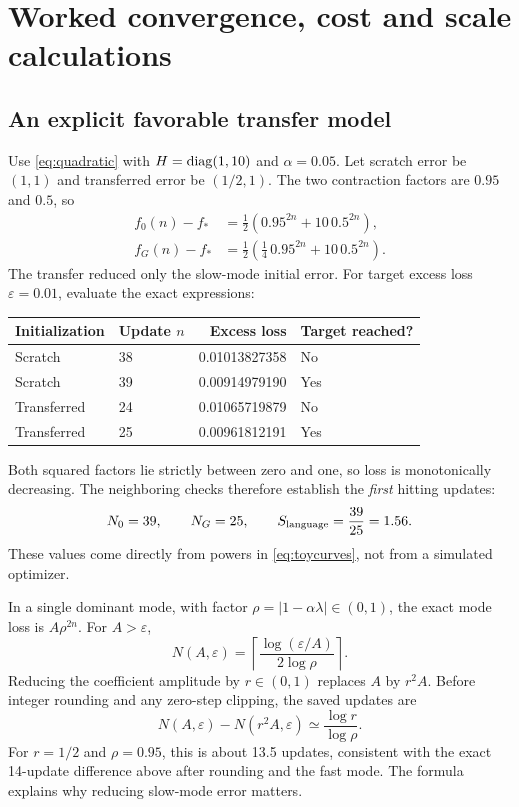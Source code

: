 \section{Worked convergence, cost and scale calculations}
\label{sec:numerical}

\subsection{An explicit favorable transfer model}

Use \eqref{eq:quadratic} with $H=\operatorname{diag}(1,10)$ and $\alpha=0.05$.
Let scratch error be $(1,1)$ and transferred error be $(1/2,1)$.
The two contraction factors are $0.95$ and $0.5$, so
\begin{align}
 f_0(n)-f_*&=\frac12\left(0.95^{2n}+10\,0.5^{2n}\right),\\
 f_G(n)-f_*&=\frac12\left(\frac14\,0.95^{2n}
                                  +10\,0.5^{2n}\right).
 \label{eq:toycurves}
\end{align}
The transfer reduced only the slow-mode initial error.
For target excess loss $\varepsilon=0.01$, evaluate the exact expressions:
\begin{center}
\begin{tabular}{@{}llrl@{}}
\toprule
Initialization & Update $n$ & Excess loss & Target reached?\\
\midrule
Scratch & 38 & 0.01013827358 & No\\
Scratch & 39 & 0.00914979190 & Yes\\
Transferred & 24 & 0.01065719879 & No\\
Transferred & 25 & 0.00961812191 & Yes\\
\bottomrule
\end{tabular}
\end{center}
Both squared factors lie strictly between zero and one, so loss is
monotonically decreasing. The neighboring checks therefore establish
the \emph{first} hitting updates:
\begin{equation}
 N_0=39,\qquad N_G=25,\qquad
 S_{\rm language}=\frac{39}{25}=1.56.
\end{equation}
These values come directly from powers in \eqref{eq:toycurves}, not
from a simulated optimizer.

In a single dominant mode, with factor $\rho=|1-\alpha\lambda|\in(0,1)$,
the exact mode loss is $A\rho^{2n}$. For $A>\varepsilon$,
\begin{equation}
 N(A,\varepsilon)=
 \left\lceil\frac{\log(\varepsilon/A)}{2\log\rho}\right\rceil.
 \label{eq:onemodehit}
\end{equation}
Reducing the coefficient amplitude by $r\in(0,1)$ replaces $A$ by
$r^2A$. Before integer rounding and any zero-step clipping, the saved
updates are
\begin{equation}
 N(A,\varepsilon)-N(r^2A,\varepsilon)
 \simeq\frac{\log r}{\log\rho}.
\end{equation}
For $r=1/2$ and $\rho=0.95$, this is about 13.5 updates, consistent with
the exact 14-update difference above after rounding and the fast mode.
The formula explains why reducing slow-mode error matters.

